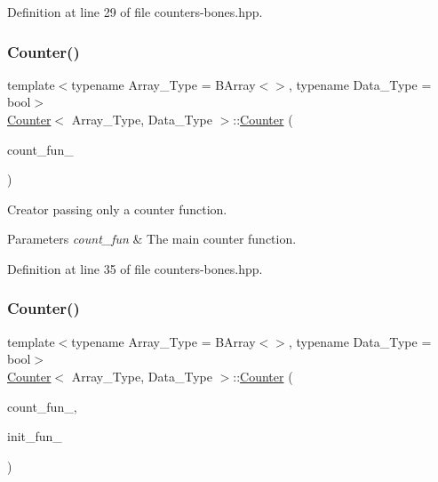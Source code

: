 Definition at line 29 of file counters-\/bones.\+hpp.

\mbox{\label{class_counter_a1cb9cb17062f8785fcb4c4babd932d68}} 
\subsubsection{\texorpdfstring{Counter()}{Counter()}\hspace{0.1cm}{\footnotesize\ttfamily [2/3]}}
{\footnotesize\ttfamily template$<$typename Array\+\_\+\+Type = B\+Array$<$$>$, typename Data\+\_\+\+Type = bool$>$ \\
\hyperlink{class_counter}{Counter}$<$ Array\+\_\+\+Type, Data\+\_\+\+Type $>$\+::\hyperlink{class_counter}{Counter} (\begin{DoxyParamCaption}\item[{\hyperlink{typedefs_8hpp_ac0160f52f564dea3ac033b374cffbfe7}{Counter\+\_\+fun\+\_\+type}$<$ Array\+\_\+\+Type, Data\+\_\+\+Type $>$}]{count\+\_\+fun\+\_\+ }\end{DoxyParamCaption})\hspace{0.3cm}{\ttfamily [inline]}}



Creator passing only a counter function. 


\begin{DoxyParams}{Parameters}
{\em count\+\_\+fun} & The main counter function. \\
\hline
\end{DoxyParams}


Definition at line 35 of file counters-\/bones.\+hpp.

\mbox{\label{class_counter_a6085b2ef220e2706c9558001f76125bd}} 
\subsubsection{\texorpdfstring{Counter()}{Counter()}\hspace{0.1cm}{\footnotesize\ttfamily [3/3]}}
{\footnotesize\ttfamily template$<$typename Array\+\_\+\+Type = B\+Array$<$$>$, typename Data\+\_\+\+Type = bool$>$ \\
\hyperlink{class_counter}{Counter}$<$ Array\+\_\+\+Type, Data\+\_\+\+Type $>$\+::\hyperlink{class_counter}{Counter} (\begin{DoxyParamCaption}\item[{\hyperlink{typedefs_8hpp_ac0160f52f564dea3ac033b374cffbfe7}{Counter\+\_\+fun\+\_\+type}$<$ Array\+\_\+\+Type, Data\+\_\+\+Type $>$}]{count\+\_\+fun\+\_\+,  }\item[{\hyperlink{typedefs_8hpp_ac0160f52f564dea3ac033b374cffbfe7}{Counter\+\_\+fun\+\_\+type}$<$ Array\+\_\+\+Type, Data\+\_\+\+Type $>$}]{init\+\_\+fun\+\_\+ }\end{DoxyParamCaption})\hspace{0.3cm}{\ttfamily [inline]}}



